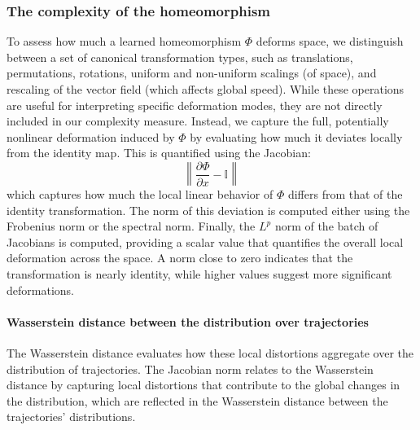 \documentclass{article}
\theoremstyle{definition} \newtheorem{definition}{Definition}  \newtheorem{example}{Example}
\theoremstyle{remark} \newtheorem{remark}{Remark}
\newcounter{ct}
\begin{document}
\subsubsection{The complexity of the homeomorphism}
To assess how much a learned homeomorphism $\Phi$ deforms space, we distinguish between a set of canonical transformation types, such as translations, permutations, rotations, uniform and non-uniform scalings (of space), and rescaling of the vector field (which affects global speed).
 While these operations are useful for interpreting specific deformation modes, they are not directly included in our complexity measure.
Instead, we capture the full, potentially nonlinear deformation induced by $\Phi$ by evaluating how much it deviates locally from the identity map. This is quantified using the Jacobian:
\begin{equation}
\left\|\frac{\partial \Phi}{\partial x} - \mathbb{I}\right\|
\end{equation}
which captures how much the local linear behavior of $\Phi$ differs from that of the identity transformation.
The norm of this deviation is computed either using the Frobenius norm or the spectral norm.
Finally, the \( L^p \) norm of the batch of Jacobians is computed, providing a scalar value that quantifies the overall local deformation across the space. A norm close to zero indicates that the transformation is nearly identity, while higher values suggest more significant deformations.


\paragraph{Wasserstein distance between the distribution over trajectories}
\citep{bion2019wasserstein}
The Wasserstein distance evaluates how these local distortions aggregate over the distribution of trajectories.
The Jacobian norm relates to the Wasserstein distance by capturing local distortions that contribute to the global changes in the distribution, which are reflected in the Wasserstein distance between the trajectories' distributions.


\end{document}
